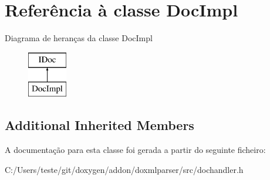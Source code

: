 \hypertarget{class_doc_impl}{\section{Referência à classe Doc\-Impl}
\label{class_doc_impl}
}
Diagrama de heranças da classe Doc\-Impl\begin{figure}[H]
\begin{center}
\leavevmode
\includegraphics[height=2.000000cm]{class_doc_impl}
\end{center}
\end{figure}
\subsection*{Additional Inherited Members}


A documentação para esta classe foi gerada a partir do seguinte ficheiro\-:\begin{DoxyCompactItemize}
\item 
C\-:/\-Users/teste/git/doxygen/addon/doxmlparser/src/dochandler.\-h\end{DoxyCompactItemize}
